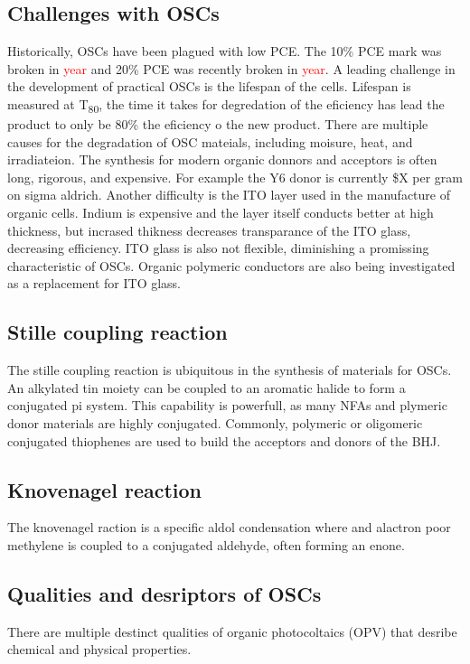 \subsection{Challenges with OSCs}
Historically, OSCs have been plagued with low PCE.
The 10\% PCE mark was broken in \textcolor{red}{year} and 20\% PCE was recently broken in \textcolor{red}{year}.
A leading challenge in the development of practical OSCs is the lifespan of the cells.
Lifespan is measured at T\textsubscript{80}, the time it takes for degredation of the eficiency has lead the product to only be 80\% the eficiency o the new product\autocite{duEfficientPolymerSolar2019}.
There are multiple causes for the degradation of OSC mateials, including moisure, heat, and irradiateion\autocite{tetreaultAssessingIndividualMaterial2024}.
The synthesis for modern organic donnors and acceptors is often long, rigorous, and expensive.
For example the Y6 donor is currently \$X per gram on sigma aldrich.
Another difficulty is the ITO layer used in the manufacture of organic cells.
Indium is expensive and the layer itself conducts better at high thickness, but incrased thikness decreases transparance of the ITO glass, decreasing efficiency.
ITO glass is also not flexible, diminishing a promissing characteristic of OSCs.
Organic polymeric conductors are also being investigated as a replacement for ITO glass.

\subsection{Stille coupling reaction}
The stille coupling reaction is ubiquitous in the synthesis of materials for OSCs.
An alkylated tin moiety can be coupled to an aromatic halide to form a conjugated pi system.
This capability is powerfull, as many NFAs and plymeric donor materials are highly conjugated.
Commonly, polymeric or oligomeric conjugated thiophenes are used to build the acceptors and donors of the BHJ.

\subsection{Knovenagel reaction}
The knovenagel raction is a specific aldol condensation where and alactron poor methylene is coupled to a conjugated aldehyde, often forming an enone.

\subsection{Qualities and desriptors of OSCs}
There are multiple destinct qualities of organic photocoltaics (OPV) that desribe chemical and physical properties.

